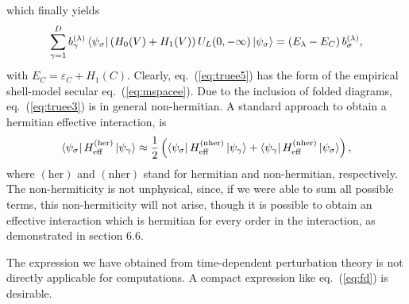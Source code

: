 which finally yields 
\begin{equation}
     {\displaystyle
     \sum_{\gamma =1}^{D}b_{\gamma}^{(\lambda )}\left\langle \psi_{\sigma} \right|
     \left(H_0(V)+H_1(V)\right) U_L(0,-\infty )
     \left| \psi_{\sigma} \right\rangle  } =
     \left(E_{\lambda}-E_C\right) b_{\sigma}^{(\lambda )},
     \label{eq:truee5}
\end{equation}
with $E_C=\varepsilon_C +H_1(C)$. Clearly, eq.\ (\ref{eq:truee5}) has the 
form of the empirical shell-model secular eq.\ (\ref{eq:mspacee}). 
Due to the inclusion of folded diagrams, eq.\ (\ref{eq:truee3}) is 
in general non-hermitian. 
A standard approach to obtain a hermitian effective
interaction, is 
\begin{equation}
      \left\langle \psi_{\sigma} \right|H_{\mathrm{eff}}^{(\mathrm{her})}
      \left| \psi_{\gamma} \right\rangle\approx
      \frac{1}{2}\left( \left\langle \psi_{\sigma} \right|H_{\mathrm{eff}}^{(\mathrm{nher})}
      \left| \psi_{\gamma} \right\rangle+
      \left\langle \psi_{\gamma} \right|H_{\mathrm{eff}}^{(\mathrm{nher})}
      \left| \psi_{\sigma} \right\rangle\right),
      \label{eq:bruteforce}
\end{equation}
where $(\mathrm{her})$ and $(\mathrm{nher})$
stand for hermitian and non-hermitian,
respectively.
The non-hermiticity is not unphysical, since, if we were able
to sum all possible terms, this non-hermiticity will not arise, though
it is possible to obtain an effective interaction which is
hermitian for every order in the interaction, as demonstrated 
in section 6.6.

The expression we have obtained from time-dependent perturbation
theory is not directly applicable for computations. A compact 
expression like eq.\ (\ref{eq:fd}) is desirable. 

